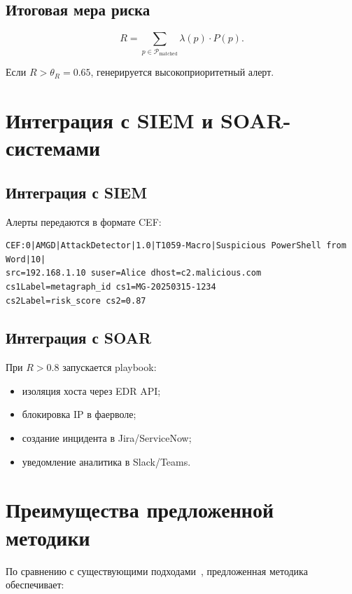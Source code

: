 \subsection{Итоговая мера риска}

\begin{equation}
    R = \sum_{p \in \mathcal{P}_{\text{matched}}} \lambda(p) \cdot P(p).
    \label{eq:risk_score}
\end{equation}

Если $R > \theta_R = 0.65$, генерируется высокоприоритетный алерт.

\section{Интеграция с SIEM и SOAR-системами}\label{sec:ch3/sect6}

\subsection{Интеграция с SIEM}

Алерты передаются в формате CEF:

\begin{verbatim}
CEF:0|AMGD|AttackDetector|1.0|T1059-Macro|Suspicious PowerShell from Word|10|
src=192.168.1.10 suser=Alice dhost=c2.malicious.com 
cs1Label=metagraph_id cs1=MG-20250315-1234 
cs2Label=risk_score cs2=0.87
\end{verbatim}

\subsection{Интеграция с SOAR}

При $R > 0.8$ запускается playbook:

\noindent
\begin{itemize} 
    \item изоляция хоста через EDR API;
    \item блокировка IP в фаерволе;
    \item создание инцидента в Jira/ServiceNow;
    \item уведомление аналитика в Slack/Teams.
\end{itemize}

\section{Преимущества предложенной методики}\label{sec:ch3/sect7}

По сравнению с существующими подходами~\cite{Gorbachev2018,Latypov2020}, предложенная методика обеспечивает:

